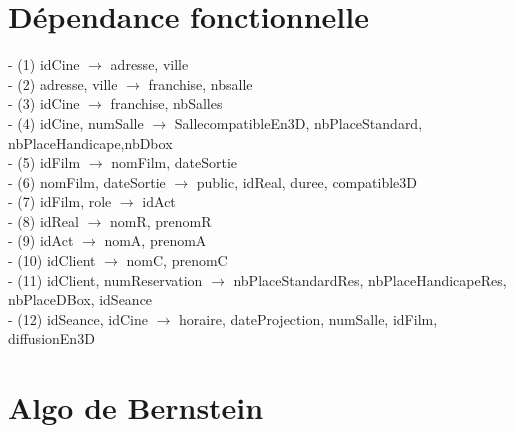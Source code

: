\documentclass[a4paper,sffamily,12pt]{article}
\begin{document}
%			
%				
%			
			
			\section{Dépendance fonctionnelle}
			
				\noindent- (1) idCine $\rightarrow$ adresse, ville \\
				- (2) adresse, ville $\rightarrow$ franchise, nbsalle \\
				- (3) idCine $\rightarrow$ franchise, nbSalles \\
				- (4) idCine, numSalle $\rightarrow$ SallecompatibleEn3D, nbPlaceStandard, nbPlaceHandicape,nbDbox \\
		 		- (5) idFilm $\rightarrow$ nomFilm, dateSortie \\
				- (6) nomFilm, dateSortie $\rightarrow$ public, idReal, duree, compatible3D \\
				- (7) idFilm, role $\rightarrow$  idAct \\
				- (8) idReal $\rightarrow$ nomR, prenomR \\
				- (9) idAct $\rightarrow$ nomA, prenomA \\
				- (10) idClient $\rightarrow$ nomC, prenomC \\
				- (11) idClient, numReservation $\rightarrow$ nbPlaceStandardRes, nbPlaceHandicapeRes, nbPlaceDBox, idSeance \\
				- (12) idSeance, idCine $\rightarrow$ horaire, dateProjection, numSalle, idFilm, diffusionEn3D \\
				
			\section{Algo de Bernstein}
	
\end{document}
